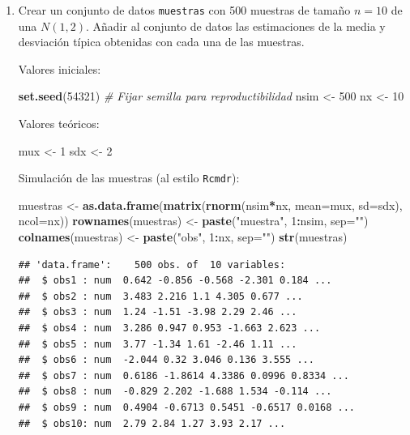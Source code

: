 \documentclass[]{book}
\newenvironment{Shaded}{\begin{snugshade}}{\end{snugshade}}
\newcommand{\KeywordTok}[1]{\textcolor[rgb]{0.13,0.29,0.53}{\textbf{#1}}}
\newcommand{\DataTypeTok}[1]{\textcolor[rgb]{0.13,0.29,0.53}{#1}}
\newcommand{\DecValTok}[1]{\textcolor[rgb]{0.00,0.00,0.81}{#1}}
\newcommand{\StringTok}[1]{\textcolor[rgb]{0.31,0.60,0.02}{#1}}
\newcommand{\CommentTok}[1]{\textcolor[rgb]{0.56,0.35,0.01}{\textit{#1}}}
\newcommand{\OperatorTok}[1]{\textcolor[rgb]{0.81,0.36,0.00}{\textbf{#1}}}
\newcommand{\NormalTok}[1]{#1}
\theoremstyle{definition}
\theoremstyle{definition}
\theoremstyle{definition}
\theoremstyle{remark}
\begin{document}
\begin{enumerate}
\def\labelenumi{\alph{enumi})}
\item
  Crear un conjunto de datos \texttt{muestras} con 500 muestras de
  tamaño \(n=10\) de una \(N(1,2)\). Añadir al conjunto de datos las
  estimaciones de la media y desviación típica obtenidas con cada una de
  las muestras.

  Valores iniciales:

\begin{Shaded}
\begin{Highlighting}[]
\KeywordTok{set.seed}\NormalTok{(}\DecValTok{54321}\NormalTok{) }\CommentTok{# Fijar semilla para reproductibilidad}
\NormalTok{nsim <-}\StringTok{ }\DecValTok{500}
\NormalTok{nx <-}\StringTok{ }\DecValTok{10}
\end{Highlighting}
\end{Shaded}

  Valores teóricos:

\begin{Shaded}
\begin{Highlighting}[]
\NormalTok{mux <-}\StringTok{ }\DecValTok{1}
\NormalTok{sdx <-}\StringTok{ }\DecValTok{2}
\end{Highlighting}
\end{Shaded}

  Simulación de las muestras (al estilo \texttt{Rcmdr}):

\begin{Shaded}
\begin{Highlighting}[]
\NormalTok{muestras <-}\StringTok{ }\KeywordTok{as.data.frame}\NormalTok{(}\KeywordTok{matrix}\NormalTok{(}\KeywordTok{rnorm}\NormalTok{(nsim}\OperatorTok{*}\NormalTok{nx, }\DataTypeTok{mean=}\NormalTok{mux, }\DataTypeTok{sd=}\NormalTok{sdx), }\DataTypeTok{ncol=}\NormalTok{nx))}
\KeywordTok{rownames}\NormalTok{(muestras) <-}\StringTok{ }\KeywordTok{paste}\NormalTok{(}\StringTok{"muestra"}\NormalTok{, }\DecValTok{1}\OperatorTok{:}\NormalTok{nsim, }\DataTypeTok{sep=}\StringTok{""}\NormalTok{)}
\KeywordTok{colnames}\NormalTok{(muestras) <-}\StringTok{ }\KeywordTok{paste}\NormalTok{(}\StringTok{"obs"}\NormalTok{, }\DecValTok{1}\OperatorTok{:}\NormalTok{nx, }\DataTypeTok{sep=}\StringTok{""}\NormalTok{)}
\KeywordTok{str}\NormalTok{(muestras)}
\end{Highlighting}
\end{Shaded}

\begin{verbatim}
## 'data.frame':    500 obs. of  10 variables:
##  $ obs1 : num  0.642 -0.856 -0.568 -2.301 0.184 ...
##  $ obs2 : num  3.483 2.216 1.1 4.305 0.677 ...
##  $ obs3 : num  1.24 -1.51 -3.98 2.29 2.46 ...
##  $ obs4 : num  3.286 0.947 0.953 -1.663 2.623 ...
##  $ obs5 : num  3.77 -1.34 1.61 -2.46 1.11 ...
##  $ obs6 : num  -2.044 0.32 3.046 0.136 3.555 ...
##  $ obs7 : num  0.6186 -1.8614 4.3386 0.0996 0.8334 ...
##  $ obs8 : num  -0.829 2.202 -1.688 1.534 -0.114 ...
##  $ obs9 : num  0.4904 -0.6713 0.5451 -0.6517 0.0168 ...
##  $ obs10: num  2.79 2.84 1.27 3.93 2.17 ...
\end{verbatim}


\end{enumerate}
\end{document}
